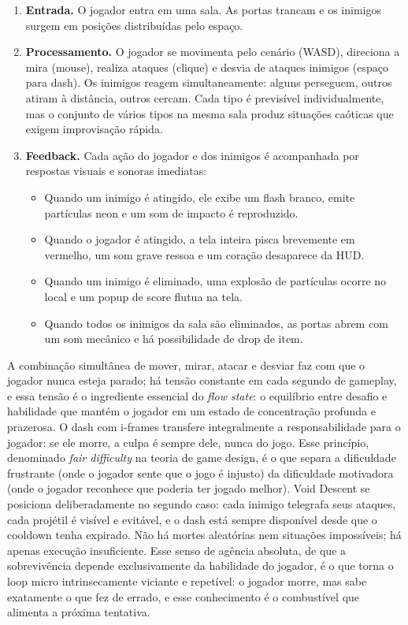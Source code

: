 \documentclass[12pt, a4paper]{article}
\begin{document}
\begin{enumerate}
  \item \textbf{Entrada.} O jogador entra em uma sala. As portas trancam e os inimigos surgem em posi\c{c}\~oes distribu\'idas pelo espa\c{c}o.
  \item \textbf{Processamento.} O jogador se movimenta pelo cen\'ario (WASD), direciona a mira (mouse), realiza ataques (clique) e desvia de ataques inimigos (espa\c{c}o para dash). Os inimigos reagem simultaneamente: alguns perseguem, outros atiram \`a dist\^ancia, outros cercam. Cada tipo \'e previs\'ivel individualmente, mas o conjunto de v\'arios tipos na mesma sala produz situa\c{c}\~oes ca\'oticas que exigem improvisa\c{c}\~ao r\'apida.
  \item \textbf{Feedback.} Cada a\c{c}\~ao do jogador e dos inimigos \'e acompanhada por respostas visuais e sonoras imediatas:
    \begin{itemize}
      \item Quando um inimigo \'e atingido, ele exibe um flash branco, emite part\'iculas neon e um som de impacto \'e reproduzido.
      \item Quando o jogador \'e atingido, a tela inteira pisca brevemente em vermelho, um som grave ressoa e um cora\c{c}\~ao desaparece da HUD.
      \item Quando um inimigo \'e eliminado, uma explos\~ao de part\'iculas ocorre no local e um popup de score flutua na tela.
      \item Quando todos os inimigos da sala s\~ao eliminados, as portas abrem com um som mec\^anico e h\'a possibilidade de drop de item.
    \end{itemize}
\end{enumerate}

A combina\c{c}\~ao simult\^anea de mover, mirar, atacar e desviar faz com que o jogador nunca esteja parado; h\'a tens\~ao constante em cada segundo de gameplay, e essa tens\~ao \'e o ingrediente essencial do \textit{flow state}: o equil\'ibrio entre desafio e habilidade que mant\'em o jogador em um estado de concentra\c{c}\~ao profunda e prazerosa. O dash com i-frames transfere integralmente a responsabilidade para o jogador: se ele morre, a culpa \'e sempre dele, nunca do jogo. Esse princ\'ipio, denominado \textit{fair difficulty} na teoria de game design, \'e o que separa a dificuldade frustrante (onde o jogador sente que o jogo \'e injusto) da dificuldade motivadora (onde o jogador reconhece que poderia ter jogado melhor). Void Descent se posiciona deliberadamente no segundo caso: cada inimigo telegrafa seus ataques, cada proj\'etil \'e vis\'ivel e evit\'avel, e o dash est\'a sempre dispon\'ivel desde que o cooldown tenha expirado. N\~ao h\'a mortes aleat\'orias nem situa\c{c}\~oes imposs\'iveis; h\'a apenas execu\c{c}\~ao insuficiente. Esse senso de ag\^encia absoluta, de que a sobreviv\^encia depende exclusivamente da habilidade do jogador, \'e o que torna o loop micro intrinsecamente viciante e repet\'ivel: o jogador morre, mas sabe exatamente o que fez de errado, e esse conhecimento \'e o combust\'ivel que alimenta a pr\'oxima tentativa.
\end{document}
